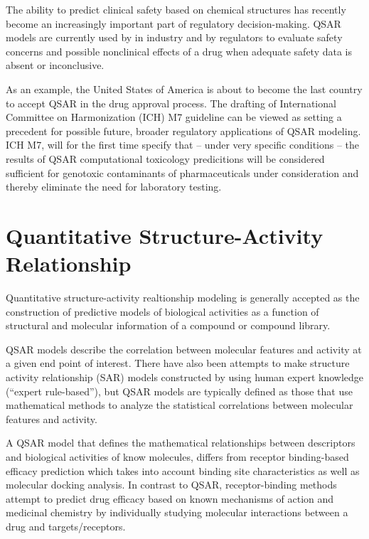 The ability to predict clinical safety based on chemical structures has recently become an increasingly important part of regulatory decision-making. QSAR models are currently used by in industry and by regulators to evaluate safety concerns and possible nonclinical effects of a drug when adequate safety data is absent or inconclusive. \cite{Kruhlak2012}

As an example, the United States of America is about to become the last country to accept QSAR in the drug approval process. The drafting of International Committee on Harmonization (ICH) M7 guideline can be viewed as setting a precedent for possible future, broader regulatory applications of QSAR modeling. ICH M7, will for the first time specify that -- under very specific conditions -- the results of QSAR computational toxicology predicitions will be considered sufficient for genotoxic contaminants of pharmaceuticals under consideration and thereby eliminate the need for laboratory testing. \cite{Kruhlak2012}


\section{Quantitative Structure-Activity Relationship}

Quantitative structure-activity realtionship modeling is generally accepted as the construction of predictive models of biological activities as a function of structural and molecular information of a compound or compound library. \cite{Nantasenamat2009}

QSAR models describe the correlation between molecular features and activity at a given end point of interest. There have also been attempts to make structure activity relationship (SAR) models constructed by using human expert knowledge (“expert rule-based”), but QSAR models are typically defined as those that use mathematical methods to analyze the statistical correlations between molecular features and activity. 

A QSAR model that defines the mathematical relationships between descriptors and biological activities of know molecules, differs from receptor binding-based efficacy prediction which takes into account binding site characteristics as well as molecular docking analysis. In contrast to QSAR, receptor-binding methods attempt to predict drug efficacy based on known mechanisms of action and medicinal chemistry by individually studying molecular interactions between a drug and targets/receptors. \cite{Kruhlak2012}

